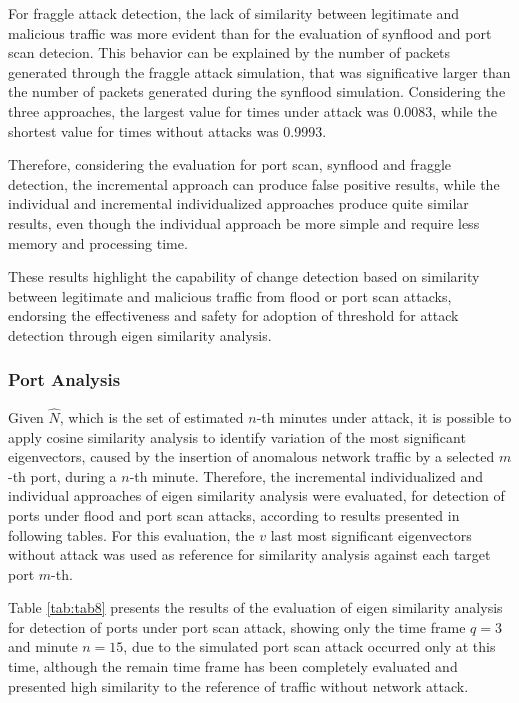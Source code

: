 For fraggle attack detection, the lack of similarity between legitimate and malicious traffic was more evident than for the evaluation of synflood and port scan detecion. This behavior can be explained by the number of packets generated through the fraggle attack simulation, that was significative larger than the number of packets generated during the synflood simulation. Considering the three approaches, the largest value for times under attack was 0.0083, while the shortest value for times without attacks was 0.9993. 

Therefore, considering the evaluation for port scan, synflood and fraggle detection, the incremental approach can produce false positive results, while the individual and incremental individualized approaches produce quite similar results, even though the individual approach be more simple and require less memory and processing time.

These results highlight the capability of change detection based on similarity between legitimate and malicious traffic from flood or port scan attacks, endorsing the effectiveness and safety for adoption of threshold for attack detection through eigen similarity analysis.

\subsubsection{Port Analysis}
\label{sec:2_PortAnalysis}

Given $\hat{N}$, which is the set of estimated $n$-th minutes under attack, it is possible to apply cosine similarity analysis to identify variation of the most significant eigenvectors, caused by the insertion of anomalous network traffic by a selected $m$-th port, during a $n$-th minute. Therefore, the incremental individualized and individual approaches of eigen similarity analysis were evaluated, for detection of ports under flood and port scan attacks, according to results presented in following tables. For this evaluation, the $v$ last most significant eigenvectors without attack was used as reference for similarity analysis against each target port $m$-th.

Table \ref{tab:tab8} presents the results of the evaluation of eigen similarity analysis for detection of ports under port scan attack, showing only the time frame $q=3$ and minute $n=15$, due to the simulated port scan attack occurred only at this time, although the remain time frame has been completely evaluated and presented high similarity to the reference of traffic without network attack.

